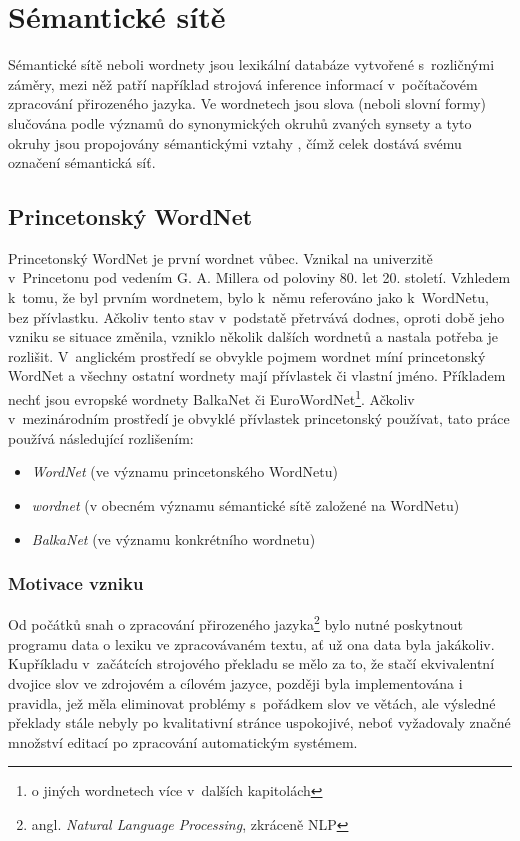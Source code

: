 \documentclass[a4paper,11pt,openany,twoside]{book}
\begin{document}
	\newpage

	\part{Sémantické sítě}
	\label{part:eins}

		{\noindent Sémantické sítě neboli wordnety jsou lexikální databáze vytvořené s~rozličnými záměry, mezi něž patří například strojová inference informací v~počítačovém zpracování přirozeného jazyka. Ve wordnetech jsou slova (neboli slovní formy) slučována podle významů do synonymických okruhů zvaných synsety a tyto okruhy jsou propojovány sémantickými vztahy \parencite{pala2013vceska, princetonWN}, čímž celek dostává svému označení sémantická síť.}

		\chapter{Princetonský WordNet} %
		\label{cha:princeton_wn}
		
			Princetonský WordNet je první wordnet vůbec. Vznikal na univerzitě v~Princetonu pod vedením G. A. Millera od poloviny 80. let 20. století. Vzhledem k~tomu, že byl prvním wordnetem, bylo k~němu referováno jako k~WordNetu, bez přívlastku. Ačkoliv tento stav v~podstatě přetrvává dodnes, oproti době jeho vzniku se situace změnila, vzniklo několik dalších wordnetů a nastala potřeba je rozlišit. V~anglickém prostředí se obvykle pojmem wordnet míní  princetonský WordNet a všechny ostatní wordnety mají přívlastek či vlastní jméno. Příkladem nechť jsou evropské wordnety BalkaNet či EuroWordNet\footnote{o jiných wordnetech více v~dalších kapitolách}. Ačkoliv v~mezinárodním prostředí je obvyklé přívlastek princetonský používat, tato práce používá následující rozlišením:

			\begin{itemize}
				\item \textit{WordNet} (ve významu princetonského WordNetu)
				\item \textit{wordnet} (v obecném významu sémantické sítě založené na WordNetu)
				\item \textit{BalkaNet} (ve významu konkrétního wordnetu)
			\end{itemize}

			\section{Motivace vzniku}
				Od počátků snah o zpracování přirozeného jazyka\footnote{angl. \textit{Natural Language Processing}, zkráceně NLP} bylo nutné poskytnout programu data o lexiku ve zpracovávaném textu, ať už ona data byla jakákoliv. Kupříkladu v~začátcích strojového překladu se mělo za to, že stačí ekvivalentní dvojice slov ve zdrojovém a cílovém jazyce, později byla implementována i pravidla, jež měla eliminovat problémy s~pořádkem slov ve větách, ale výsledné překlady stále nebyly po kvalitativní stránce uspokojivé, neboť vyžadovaly značné množství editací po zpracování automatickým systémem. \parencite{hutchins1982evolution}
\end{document}
